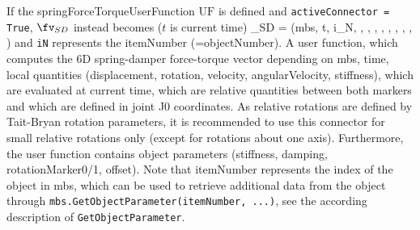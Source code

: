    If the springForceTorqueUserFunction $\mathrm{UF}$ is defined and \texttt{activeConnector = True}, 
	$\fv_{SD}$ instead becomes ($t$ is current time)
    \be
      \fv_{SD} = (mbs, t, i_N, , , , , 
	                         , , , , )
    \ee
    and \texttt{iN} represents the itemNumber (=objectNumber).
    A user function, which computes the 6D spring-damper force-torque vector depending on mbs, time, local quantities 
	(displacement, rotation, velocity, angularVelocity, stiffness), which are evaluated at current time, which are relative quantities between 
	both markers and which are defined in joint J0 coordinates. 
	As relative rotations are defined by Tait-Bryan rotation parameters, it is recommended to use this connector for small relative rotations only 
	(except for rotations about one axis).
	Furthermore, the user function contains object parameters (stiffness, damping, rotationMarker0/1, offset).
    Note that itemNumber represents the index of the object in mbs, which can be used to retrieve additional data from the object through
    \texttt{mbs.GetObjectParameter(itemNumber, ...)}, see the according description of \texttt{GetObjectParameter}.
    
